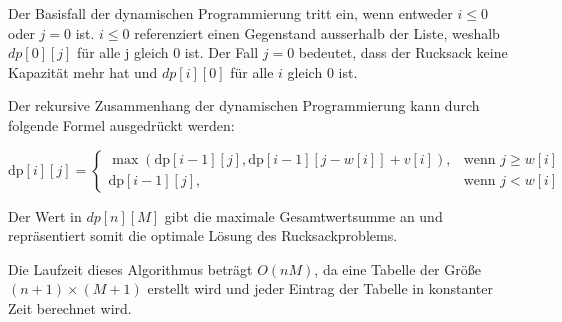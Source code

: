 Der Basisfall der dynamischen Programmierung tritt ein, wenn 
entweder $i \le 0$ oder $j = 0$ ist. $i \le 0$ referenziert einen 
Gegenstand ausserhalb der Liste, weshalb $dp[0][j]$ für alle j gleich 0 ist. 
Der Fall $j = 0$ bedeutet, 
dass der Rucksack keine Kapazität mehr hat und $dp[i][0]$ 
für alle $i$ gleich $0$ ist.

Der rekursive Zusammenhang der dynamischen Programmierung 
kann durch folgende Formel ausgedrückt werden:

\begin{equation}
    \text{dp}[i][j] = \begin{cases}
        \max(\text{dp}[i-1][j], \text{dp}[i-1][j-w[i]] + v[i]), & \text{wenn } j \geq w[i] \\
        \text{dp}[i-1][j], & \text{wenn } j < w[i]
    \end{cases}
\end{equation}


Der Wert in $dp[n][M]$ gibt die maximale Gesamtwertsumme an und 
repräsentiert somit die optimale Lösung des Rucksackproblems.

Die Laufzeit dieses Algorithmus beträgt $O(nM)$, da 
eine Tabelle der Größe $(n+1) × (M+1)$ erstellt wird und 
jeder Eintrag der Tabelle in konstanter Zeit berechnet wird.\ \cite[vgl.]{Martello1987}